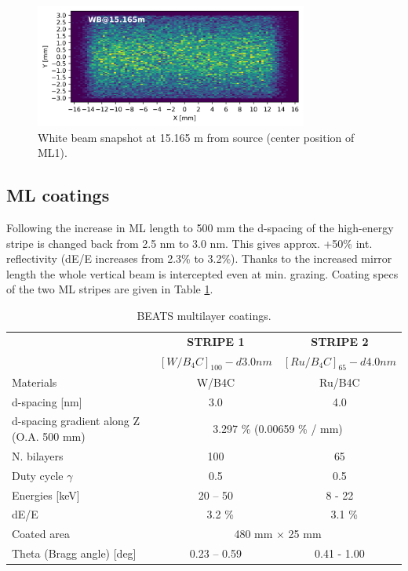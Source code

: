 \begin{figure}[ht]
\centering
\includegraphics[width=0.8\textwidth]{./../../beam_snapshots/WB_snapshot_15.165.png}
\caption{\label{fig:snapshot_ML1} White beam snapshot at 15.165 m from source (center position of ML1).}
\end{figure}

\clearpage
\subsection{ML coatings}
Following the increase in ML length to 500 mm the d-spacing of the high-energy stripe is changed back from 2.5 nm to 3.0 nm. This gives approx. +50\% int. reflectivity (dE/E increases from 2.3\% to 3.2\%). Thanks to the increased mirror length the whole vertical beam is intercepted even at min. grazing. Coating specs of the two ML stripes are given in Table \ref{tab:coatings}.
\begin{center}
\begin{table}[h]
\begin{tabular}[bhp]{| l | c | c |}
\hline
 & \textbf{STRIPE 1} & \textbf{STRIPE 2} \\
 & \textbf{$[W/B_{4}C]_{100} - d 3.0 nm $} & \textbf{$[Ru/B_{4}C]_{65} - d 4.0 nm $} \\
\hline
Materials & W/B4C & Ru/B4C \\
d-spacing [nm] & 3.0 & 4.0 \\
d-spacing gradient along Z (O.A. 500 mm) & \multicolumn{2}{c|}{3.297 \% (0.00659 \% / mm)} \\ 
N. bilayers & 100 & 65 \\
Duty cycle $\gamma$ & 0.5 & 0.5 \\
Energies [keV] & 20 – 50 & 8 - 22 \\
dE/E & ~ 3.2 \% & ~ 3.1 \% \\
Coated area & \multicolumn{2}{c|}{480 mm × 25 mm} \\
Theta (Bragg angle) [deg] & 0.23 – 0.59 & 0.41 - 1.00 \\
\hline
\end{tabular}
\caption{\label{tab:coatings} BEATS multilayer coatings.}
\end{table}
\end{center}


